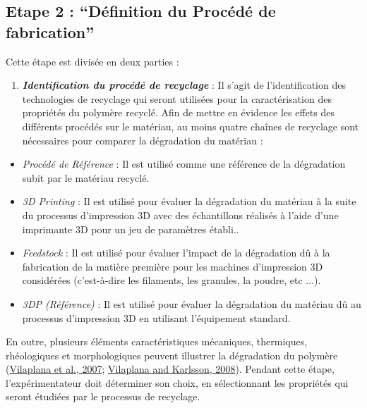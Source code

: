 \documentclass[
]{article}
\providecommand{\tightlist}{%
  \setlength{\itemsep}{0pt}\setlength{\parskip}{0pt}}
\begin{document}
\hypertarget{etape-2-duxe9finition-du-procuxe9duxe9-de-fabrication}{%
\subsection{Etape 2 : ``Définition du Procédé de fabrication''}\label{etape-2-duxe9finition-du-procuxe9duxe9-de-fabrication}}

Cette étape est divisée en deux parties :

\begin{enumerate}
\def\labelenumi{\arabic{enumi}.}
\tightlist
\item
  \textbf{\emph{Identification du procédé de recyclage}} :
  Il s'agit de l'identification des technologies de recyclage qui seront utilisées pour la caractérisation des propriétés du polymère recyclé. Afin de mettre en évidence les effets des différents procédés sur le matériau, au moins quatre chaînes de recyclage sont nécessaires pour comparer la dégradation du matériau :
\end{enumerate}

\begin{itemize}
\item
  \emph{Procédé de Référence} : Il est utilisé comme une référence de la dégradation subit par le matériau recyclé.
\item
  \emph{3D Printing} : Il est utilisé pour évaluer la dégradation du matériau à la suite du processus d'impression 3D avec des échantillons réalisés à l'aide d'une imprimante 3D pour un jeu de paramètres établi..
\item
  \emph{Feedstock} : Il est utilisé pour évaluer l'impact de la dégradation dû à la fabrication de la matière première pour les machines d'impression 3D considérées (c'est-à-dire les filaments, les granules, la poudre, etc ...).
\item
  \emph{3DP (Référence)} : Il est utilisé pour évaluer la dégradation du matériau dû au processus d'impression 3D en utilisant l'équipement standard.
\end{itemize}

En outre, plusieurs éléments caractéristiques mécaniques, thermiques, rhéologiques et morphologiques peuvent illustrer la dégradation du polymère (\protect\hyperlink{ref-Vilaplana2007}{Vilaplana et al., 2007}; \protect\hyperlink{ref-Vilaplana2008}{Vilaplana and Karlsson, 2008}).
Pendant cette étape, l'expérimentateur doit déterminer son choix, en sélectionnant les propriétés qui seront étudiées par le processus de recyclage.
\end{document}

